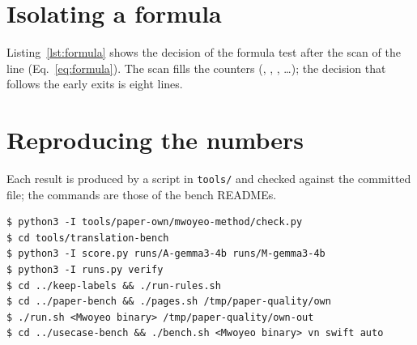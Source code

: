 \section{Isolating a formula}\label{app:formula}

Listing~\ref{lst:formula} shows the decision of the formula test after the scan of the line (Eq.~\ref{eq:formula}). The scan fills the
counters (, , , \dots); the decision that follows the early exits is eight lines.

\begin{listing}[t]

\caption{The decision of  after its early exits, \texttt{Core/Sources/MwoyeoCore/Text.swift}, lines 559--566, as it is in the repository.}\label{lst:formula}
\end{listing}

\section{Reproducing the numbers}\label{app:repro}

Each result is produced by a script in \texttt{tools/} and checked against the committed file; the commands are those of the bench READMEs.

\begin{listing}[t]
\begin{lstlisting}[style=shell]
$ python3 -I tools/paper-own/mwoyeo-method/check.py
$ cd tools/translation-bench
$ python3 -I score.py runs/A-gemma3-4b runs/M-gemma3-4b
$ python3 -I runs.py verify
$ cd ../keep-labels && ./run-rules.sh
$ cd ../paper-bench && ./pages.sh /tmp/paper-quality/own
$ ./run.sh <Mwoyeo binary> /tmp/paper-quality/own-out
$ cd ../usecase-bench && ./bench.sh <Mwoyeo binary> vn swift auto
\end{lstlisting}
\caption{Commands that reproduce or check the numbers of this paper, from the repository root.}\label{lst:repro}
\end{listing}
